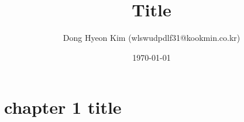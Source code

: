 \documentclass[10pt, a4paper]{report}
\title{Title}
\author{Dong Hyeon Kim (wlswudpdlf31@kookmin.co.kr)}
\date{\today}
\begin{document}
\tableofcontents
\chapter{chapter 1 title}

% 
\end{document}
